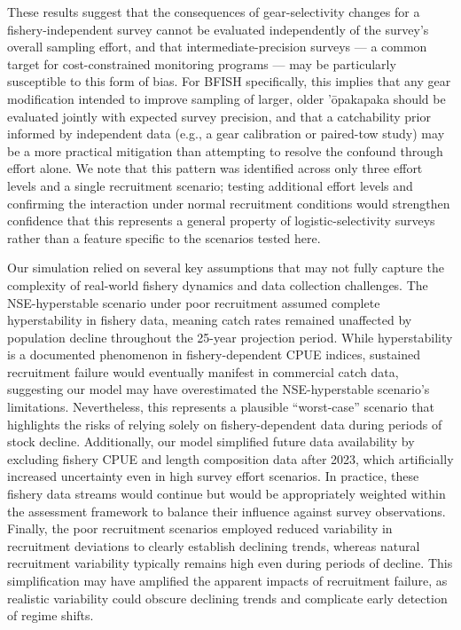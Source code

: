 \documentclass[
  letterpaper,
  12pt,
  letterpaper]{report}
\begin{document}
These results suggest that the consequences of gear-selectivity changes
for a fishery-independent survey cannot be evaluated independently of
the survey's overall sampling effort, and that intermediate-precision
surveys --- a common target for cost-constrained monitoring programs ---
may be particularly susceptible to this form of bias. For BFISH
specifically, this implies that any gear modification intended to
improve sampling of larger, older 'ōpakapaka should be evaluated jointly
with expected survey precision, and that a catchability prior informed
by independent data (e.g., a gear calibration or paired-tow study) may
be a more practical mitigation than attempting to resolve the confound
through effort alone. We note that this pattern was identified across
only three effort levels and a single recruitment scenario; testing
additional effort levels and confirming the interaction under normal
recruitment conditions would strengthen confidence that this represents
a general property of logistic-selectivity surveys rather than a feature
specific to the scenarios tested here.

Our simulation relied on several key assumptions that may not fully
capture the complexity of real-world fishery dynamics and data
collection challenges. The NSE-hyperstable scenario under poor
recruitment assumed complete hyperstability in fishery data, meaning
catch rates remained unaffected by population decline throughout the
25-year projection period. While hyperstability is a documented
phenomenon in fishery-dependent CPUE indices, sustained recruitment
failure would eventually manifest in commercial catch data, suggesting
our model may have overestimated the NSE-hyperstable scenario's
limitations. Nevertheless, this represents a plausible ``worst-case''
scenario that highlights the risks of relying solely on
fishery-dependent data during periods of stock decline. Additionally,
our model simplified future data availability by excluding fishery CPUE
and length composition data after 2023, which artificially increased
uncertainty even in high survey effort scenarios. In practice, these
fishery data streams would continue but would be appropriately weighted
within the assessment framework to balance their influence against
survey observations. Finally, the poor recruitment scenarios employed
reduced variability in recruitment deviations to clearly establish
declining trends, whereas natural recruitment variability typically
remains high even during periods of decline. This simplification may
have amplified the apparent impacts of recruitment failure, as realistic
variability could obscure declining trends and complicate early
detection of regime shifts.
\end{document}
